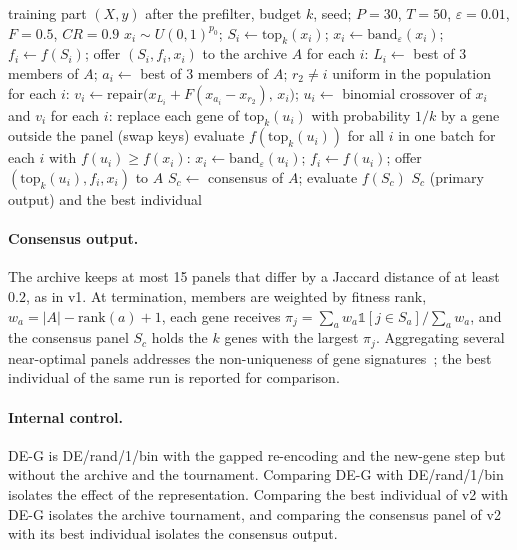 \begin{algorithm}[t]
\caption{MPQDA-DE v2 for one outer fold and one budget $k$}\label{alg:v2}
\begin{algorithmic}[1]
\Require training part $(X,y)$ after the prefilter, budget $k$, seed; $P=30$, $T=50$, $\varepsilon=0.01$, $F=0.5$, $CR=0.9$
\State $x_i\sim U(0,1)^{p_0}$; $S_i\gets\mathrm{top}_k(x_i)$; $x_i\gets\mathrm{band}_\varepsilon(x_i)$; $f_i\gets f(S_i)$; offer $(S_i,f_i,x_i)$ to the archive $A$
  \State for each $i$: $L_i\gets$ best of 3 members of $A$; $a_i\gets$ best of 3 members of $A$; $r_2\neq i$ uniform in the population
  \State for each $i$: $v_i\gets\mathrm{repair}\big(x_{L_i}+F(x_{a_i}-x_{r_2}),\,x_i\big)$; $u_i\gets$ binomial crossover of $x_i$ and $v_i$
  \State for each $i$: replace each gene of $\mathrm{top}_k(u_i)$ with probability $1/k$ by a gene outside the panel (swap keys)
  \State evaluate $f(\mathrm{top}_k(u_i))$ for all $i$ in one batch
  \State for each $i$ with $f(u_i)\ge f(x_i)$: $x_i\gets\mathrm{band}_\varepsilon(u_i)$; $f_i\gets f(u_i)$; offer $(\mathrm{top}_k(u_i),f_i,x_i)$ to $A$
\EndFor
\State $S_c\gets$ consensus of $A$; evaluate $f(S_c)$
\State \Return $S_c$ (primary output) and the best individual
\end{algorithmic}
\end{algorithm}

\paragraph{Consensus output.} The archive keeps at most 15 panels that differ by a Jaccard distance of at least $0.2$, as in v1.
At termination, members are weighted by fitness rank, $w_a=|A|-\mathrm{rank}(a)+1$, each gene receives
$\pi_j=\sum_a w_a\mathbb{1}[j\in S_a]/\sum_a w_a$, and the consensus panel $S_c$ holds the $k$ genes with the largest $\pi_j$.
Aggregating several near-optimal panels addresses the non-uniqueness of gene signatures~\cite{einDor2005}; the best
individual of the same run is reported for comparison.

\paragraph{Internal control.} DE-G is DE/rand/1/bin with the gapped re-encoding and the new-gene step but without the archive
and the tournament. Comparing DE-G with DE/rand/1/bin isolates the effect of the representation. Comparing the best
individual of v2 with DE-G isolates the archive tournament, and comparing the consensus panel of v2 with its best individual
isolates the consensus output.

